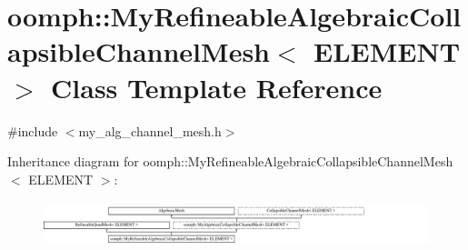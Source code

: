 \hypertarget{classoomph_1_1MyRefineableAlgebraicCollapsibleChannelMesh}{}\section{oomph\+:\+:My\+Refineable\+Algebraic\+Collapsible\+Channel\+Mesh$<$ E\+L\+E\+M\+E\+NT $>$ Class Template Reference}
\label{classoomph_1_1MyRefineableAlgebraicCollapsibleChannelMesh}


{\ttfamily \#include $<$my\+\_\+alg\+\_\+channel\+\_\+mesh.\+h$>$}

Inheritance diagram for oomph\+:\+:My\+Refineable\+Algebraic\+Collapsible\+Channel\+Mesh$<$ E\+L\+E\+M\+E\+NT $>$\+:\begin{figure}[H]
\begin{center}
\leavevmode
\includegraphics[height=1.339713cm]{classoomph_1_1MyRefineableAlgebraicCollapsibleChannelMesh}
\end{center}
\end{figure}
